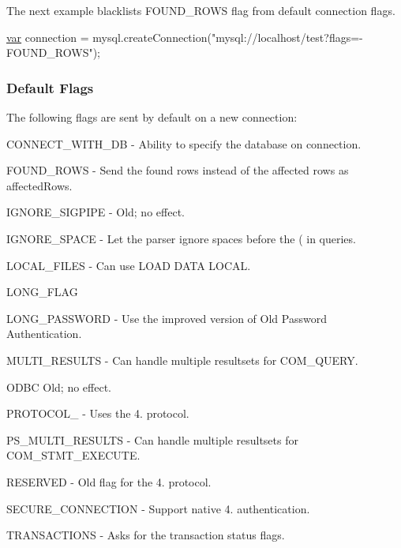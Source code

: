 The next example blacklists F\+O\+U\+N\+D\+\_\+\+R\+O\+W\+S flag from default connection flags.


\begin{DoxyCode}
\hyperlink{018__def_8c_a335628f2e9085305224b4f9cc6e95ed5}{var} connection = mysql.createConnection(\textcolor{stringliteral}{"mysql://localhost/test?flags=-FOUND\_ROWS"});
\end{DoxyCode}


\subsubsection*{Default Flags}

The following flags are sent by default on a new connection\+:


\begin{DoxyItemize}
\item {\ttfamily C\+O\+N\+N\+E\+C\+T\+\_\+\+W\+I\+T\+H\+\_\+\+D\+B} -\/ Ability to specify the database on connection.
\item {\ttfamily F\+O\+U\+N\+D\+\_\+\+R\+O\+W\+S} -\/ Send the found rows instead of the affected rows as {\ttfamily affected\+Rows}.
\item {\ttfamily I\+G\+N\+O\+R\+E\+\_\+\+S\+I\+G\+P\+I\+P\+E} -\/ Old; no effect.
\item {\ttfamily I\+G\+N\+O\+R\+E\+\_\+\+S\+P\+A\+C\+E} -\/ Let the parser ignore spaces before the {\ttfamily (} in queries.
\item {\ttfamily L\+O\+C\+A\+L\+\_\+\+F\+I\+L\+E\+S} -\/ Can use {\ttfamily L\+O\+A\+D D\+A\+T\+A L\+O\+C\+A\+L}.
\item {\ttfamily L\+O\+N\+G\+\_\+\+F\+L\+A\+G}
\item {\ttfamily L\+O\+N\+G\+\_\+\+P\+A\+S\+S\+W\+O\+R\+D} -\/ Use the improved version of Old Password Authentication.
\item {\ttfamily M\+U\+L\+T\+I\+\_\+\+R\+E\+S\+U\+L\+T\+S} -\/ Can handle multiple resultsets for C\+O\+M\+\_\+\+Q\+U\+E\+R\+Y.
\item {\ttfamily O\+D\+B\+C} Old; no effect.
\item {\ttfamily P\+R\+O\+T\+O\+C\+O\+L\+\_} -\/ Uses the 4. protocol.
\item {\ttfamily P\+S\+\_\+\+M\+U\+L\+T\+I\+\_\+\+R\+E\+S\+U\+L\+T\+S} -\/ Can handle multiple resultsets for C\+O\+M\+\_\+\+S\+T\+M\+T\+\_\+\+E\+X\+E\+C\+U\+T\+E.
\item {\ttfamily R\+E\+S\+E\+R\+V\+E\+D} -\/ Old flag for the 4. protocol.
\item {\ttfamily S\+E\+C\+U\+R\+E\+\_\+\+C\+O\+N\+N\+E\+C\+T\+I\+O\+N} -\/ Support native 4. authentication.
\item {\ttfamily T\+R\+A\+N\+S\+A\+C\+T\+I\+O\+N\+S} -\/ Asks for the transaction status flags.
\end{DoxyItemize}

